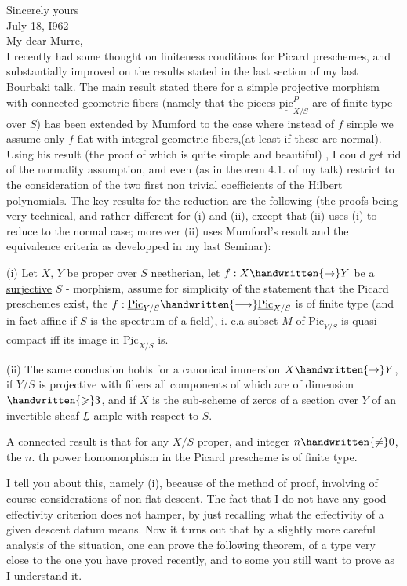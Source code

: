 Sincerely yours\\

July 18, I962\\

My dear Murre,\\

I recently had some thought on finiteness conditions for Picard preschemes, and substantially improved on the results stated in the last section of my last Bourbaki talk. The main result stated there for a simple projective morphism with connected geometric fibers (namely that the pieces $\underline{\mathrm{pic}}^{P}_{X/S}$ are of finite type over $S$) has been extended by Mumford to the case where instead of $f$ simple we assume only $f$ flat with integral geometric fibers,(at least if these are normal). Using his result (the proof of which is quite simple and beautiful) , I could get rid of the normality assumption, and even (as in theorem 4.1. of my talk) restrict to the consideration of the two first non trivial coefficients of the Hilbert polynomials. The key results for the reduction are the following (the proofs being very technical, and rather different for (i) and (ii), except that (ii) uses (i) to reduce to the normal case; moreover (ii) uses Mumford's result and the equivalence criteria as developped in my last Seminar):

(i) Let $X$, $Y$ be proper over $S$ neetherian, let $f:X\handwritten{\to}Y$ be a \uline{surjective} $S$ - morphism, assume for simplicity of the statement that the Picard preschemes exist, the $f:\underline{\mathrm{Pic}}_{Y/S}\handwritten{\longrightarrow}\underline{\mathrm{Pic}}_{X/S}$ is of finite type (and in fact affine if $S$ is the spectrum of a field), i. e.a subset $M$ of $\underline{\mathrm{Pic}}_{Y/S}$ is quasi-compact iff its image in $\underline{\mathrm{Pic}}_{X/S}$ is.

(ii) The same conclusion holds for a canonical immersion $X\handwritten{\to}Y$, if $Y/S$ is projective with fibers all components of which are of dimension $\handwritten{\geqslant}3$, and if $X$ is the sub-scheme of zeros of a section over $Y$ of an invertible sheaf $\underline{L}$ ample with respect to $S$.

A connected result is that for any $X/S$ proper, and integer $n\handwritten{\ne}0$, the $n$. th power homomorphism in the Picard prescheme is of finite type.

I tell you about this, namely (i), because of the method of proof, involving of course considerations of non flat descent. The fact that I do not have any good effectivity criterion does not hamper, by just recalling what the effectivity of a given descent datum means. Now it turns out that by a slightly more careful analysis of the situation, one can prove the following theorem, of a type very close to the one you have proved recently, and to some you still want to prove as I understand it.


